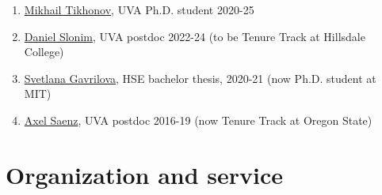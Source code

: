 \documentclass[letterpaper,11pt]{article}
\begin{document}
\begin{enumerate}
    \item \href{https://mtikhonov.com}{Mikhail Tikhonov}, UVA Ph.D. student 2020-25
    \item \href{https://danielslonim.github.io}{Daniel Slonim}, UVA postdoc 2022-24 (to be Tenure Track at Hillsdale College)
    \item \href{https://math.mit.edu/directory/profile.html?pid=2588}{Svetlana Gavrilova},  HSE bachelor thesis, 2020-21 (now Ph.D. student at MIT)
    \item \href{https://sites.google.com/view/axelsaenz}{Axel Saenz}, UVA postdoc 2016-19 (now Tenure Track at Oregon State)
\end{enumerate}

\section*{Organization and service}
\end{document}
